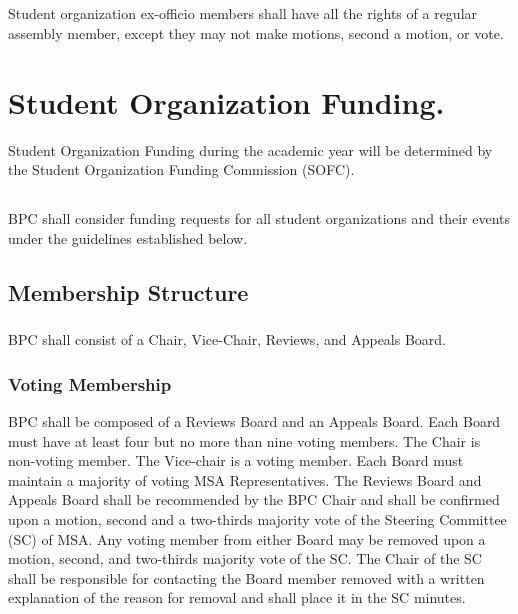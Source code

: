\subsection{}
Student organization ex-officio members shall have all the rights of a regular assembly member, except they may not make motions, second a motion, or vote.

\section{Student Organization Funding.}
Student Organization Funding during the academic year will be determined by the Student Organization Funding Commission (SOFC).

\subsection{}
BPC shall consider funding requests for all student organizations and their events under the guidelines established below.

\subsection{Membership Structure}
\subsubsection{}
BPC shall consist of a Chair, Vice-Chair, Reviews, and Appeals Board.
\subsubsection{Voting Membership}
\subsubsubsection{}
BPC shall be composed of a Reviews Board and an Appeals Board.
\subsubsubsubsection{}
Each Board must have at least four but no more than nine voting members.
\subsubsubsubsubsection{}
The Chair is non-voting member.
\subsubsubsubsubsection{}
The Vice-chair is a voting member.
\subsubsubsubsection{}
Each Board must maintain a majority of voting MSA Representatives.
\subsubsubsection{}
The Reviews Board and Appeals Board shall be recommended by the BPC Chair and shall be confirmed upon a motion, second and a two-thirds majority vote of the Steering Committee (SC) of MSA.
\subsubsubsubsection{}
Any voting member from either Board may be removed upon a motion, second, and two-thirds majority vote of the SC.
\subsubsubsubsection{}
The Chair of the SC shall be responsible for contacting the Board member removed with a written explanation of the reason for removal and shall place it in the SC minutes.

